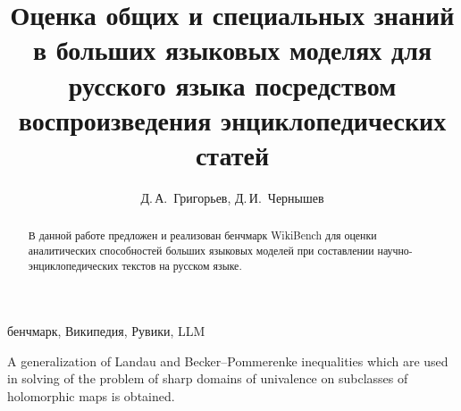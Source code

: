 \documentclass{article}
\theoremstyle{definition}
\theoremstyle{plain}
\begin{document}


\title{Оценка общих и специальных знаний в больших языковых моделях для русского языка посредством воспроизведения энциклопедических статей}

\author{Д.\,А.~Григорьев\Addressmark[1]\Emailmark[1], Д.\,И.~Чернышев\Addressmark[1]\Emailmark[2]}












\maketitle


\begin{abstract}
В данной работе предложен и реализован бенчмарк WikiBench для оценки аналитических способностей больших языковых моделей при составлении научно-энциклопедических текстов на русском языке. 
\end{abstract}

\begin{keywords}
бенчмарк, Википедия, Рувики, LLM
\end{keywords}

\begin{altabstract}
A generalization of Landau and Becker--Pommerenke inequalities which are used in solving  of the problem of sharp  domains  of univalence on subclasses of holomorphic maps is obtained.	
\end{altabstract}
\end{document}
